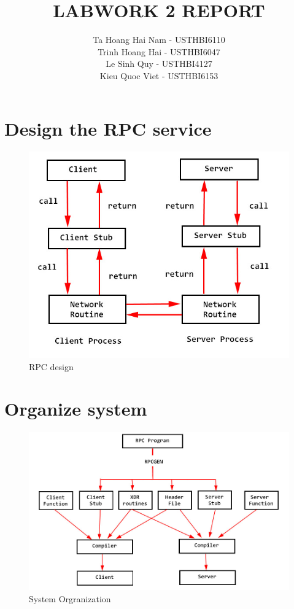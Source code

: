 \documentclass[10pt,a4paper]{article}
\title{LABWORK 2 REPORT}
\author{Ta Hoang Hai Nam - USTHBI6110 \\ Trinh Hoang Hai - USTHBI6047 \\ Le Sinh Quy - USTHBI4127 \\ Kieu Quoc Viet - USTHBI6153 }
\begin{document}
\maketitle
\newpage 
\section{Design the RPC service}  
\begin{figure}[!htb]
\includegraphics[width=\linewidth]{RPC_design.jpg}
\caption{RPC design}
\end{figure}
\newpage 
\section{Organize system}
\begin{figure}[!htb]
\includegraphics[width=\linewidth]{RPC_organization.jpg}
\caption{System Orgranization}
\end{figure}
\end{document}

